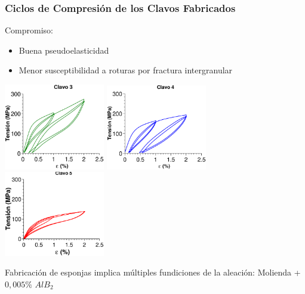 \documentclass[usenames,dvipsnames]{beamer}
\begin{document}

\begin{frame}
\frametitle{Ciclos de Compresión de los Clavos Fabricados}

\begin{block}{Compromiso:}
\begin{itemize}
 \item Buena pseudoelasticidad
 \item Menor susceptibilidad a roturas por fractura intergranular
\end{itemize}
\end{block}


 \includegraphics[width=0.33\textwidth]{img/tamgrano/Clavo3Comp.eps}
 \includegraphics[width=0.33\textwidth]{img/tamgrano/Clavo4Comp.eps}
 \includegraphics[width=0.33\textwidth]{img/tamgrano/Clavo5Comp.eps}

Fabricación de esponjas implica múltiples fundiciones de la aleación: Molienda + $0,005\%$ $AlB_2$

\end{frame}
\end{document}
